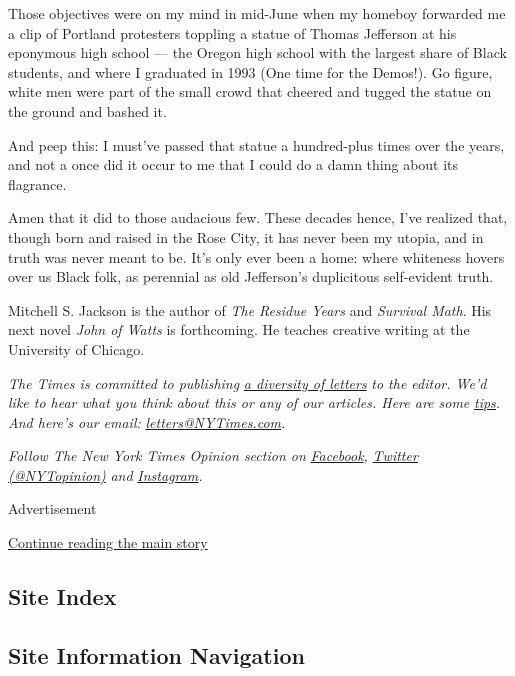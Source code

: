 Those objectives were on my mind in mid-June when my homeboy forwarded
me a clip of Portland protesters toppling a statue of Thomas Jefferson
at his eponymous high school --- the Oregon high school with the largest
share of Black students, and where I graduated in 1993 (One time for the
Demos!). Go figure, white men were part of the small crowd that cheered
and tugged the statue on the ground and bashed it.

And peep this: I must've passed that statue a hundred-plus times over
the years, and not a once did it occur to me that I could do a damn
thing about its flagrance.

Amen that it did to those audacious few. These decades hence, I've
realized that, though born and raised in the Rose City, it has never
been my utopia, and in truth was never meant to be. It's only ever been
a home: where whiteness hovers over us Black folk, as perennial as old
Jefferson's duplicitous self-evident truth.

Mitchell S. Jackson is the author of \emph{The Residue Years} and
\emph{Survival Math}. His next novel \emph{John of Watts} is
forthcoming. He teaches creative writing at the University of Chicago.

\emph{The Times is committed to publishing}
\href{https://www.nytimes3xbfgragh.onion/2019/01/31/opinion/letters/letters-to-editor-new-york-times-women.html}{\emph{a
diversity of letters}} \emph{to the editor. We'd like to hear what you
think about this or any of our articles. Here are some}
\href{https://help.nytimes3xbfgragh.onion/hc/en-us/articles/115014925288-How-to-submit-a-letter-to-the-editor}{\emph{tips}}\emph{.
And here's our email:}
\href{mailto:letters@NYTimes.com}{\emph{letters@NYTimes.com}}\emph{.}

\emph{Follow The New York Times Opinion section on}
\href{https://www.facebookcorewwwi.onion/nytopinion}{\emph{Facebook}}\emph{,}
\href{http://twitter.com/NYTOpinion}{\emph{Twitter (@NYTopinion)}}
\emph{and}
\href{https://www.instagram.com/nytopinion/}{\emph{Instagram}}\emph{.}

Advertisement

\protect\hyperlink{after-bottom}{Continue reading the main story}

\hypertarget{site-index}{%
\subsection{Site Index}\label{site-index}}

\hypertarget{site-information-navigation}{%
\subsection{Site Information
Navigation}\label{site-information-navigation}}

